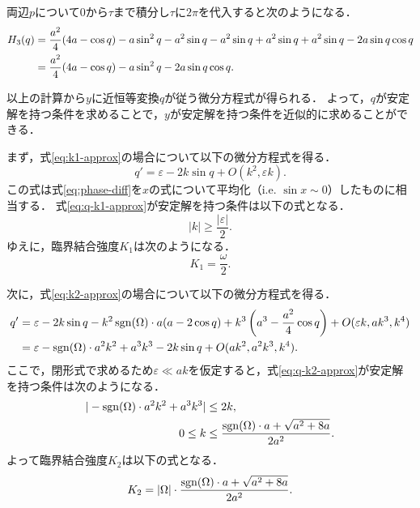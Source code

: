 \documentclass[../main]{subfiles}
\begin{document}
    両辺$p$について$0$から$\tau$まで積分し$\tau$に$2\pi$を代入すると次のようになる．
    \begin{align}
        H_3(q)&=\frac{a^2}{4}(4a-\cos q)-a\sin^2 q-a^2\sin q-a^2\sin q+a^2\sin q+a^2\sin q-2a\sin q\cos q\notag\\
        &=\frac{a^2}{4}(4a-\cos q)-a\sin^2 q-2a\sin q\cos q.
        \label{eq:H3-approx}
    \end{align}

    以上の計算から$y$に近恒等変換$q$が従う微分方程式が得られる．
    よって，$q$が安定解を持つ条件を求めることで，$y$が安定解を持つ条件を近似的に求めることができる．
    
    まず，式\eqref{eq:k1-approx}の場合について以下の微分方程式を得る．
    \begin{equation}
        q'=\varepsilon-2k\sin q+O(k^2,\varepsilon k).
        \label{eq:q-k1-approx}
    \end{equation}
    この式は式\eqref{eq:phase-diff}を$x$の式について平均化（i.e. $\sin x\sim 0$）したものに相当する．
    式\eqref{eq:q-k1-approx}が安定解を持つ条件は以下の式となる．
    \begin{equation}
        |k|\geq\frac{|\varepsilon|}{2}.
    \end{equation}
    ゆえに，臨界結合強度$K_1$は次のようになる．
    \begin{equation}
        \label{eq:K1-approx}
        K_1=\frac{\omega}{2}.
    \end{equation}

    次に，式\eqref{eq:k2-approx}の場合について以下の微分方程式を得る．
    \begin{align}
        \label{eq:q-k2-approx}
        \begin{split}
            q'&=\varepsilon-2k\sin q-k^2\operatorname{sgn}(\Omega)\cdot a(a-2\cos  q)+k^3\left(a^3-\frac{a^2}{4}\cos q\right)+O(\varepsilon k,ak^3,k^4)\\
            &=\varepsilon-\operatorname{sgn}(\Omega)\cdot a^2k^2+a^3k^3-2k\sin q+O(ak^2,a^2k^3,k^4).
        \end{split}
    \end{align}
    ここで，閉形式で求めるため$\varepsilon\ll ak$を仮定すると，式\eqref{eq:q-k2-approx}が安定解を持つ条件は次のようになる．
    \begin{align}
        |-\operatorname{sgn}(\Omega)\cdot a^2k^2+a^3k^3|&\leq 2k,\notag\\
        0\leq k&\leq \frac{\operatorname{sgn}(\Omega) \cdot a+\sqrt{a^2+8a}}{2a^2}.
    \end{align}
    よって臨界結合強度$K_2$は以下の式となる．
    \begin{equation}
        \label{eq:K2-approx}
        K_2=|\Omega|\cdot\frac{\operatorname{sgn}(\Omega) \cdot a+\sqrt{a^2+8a}}{2a^2}.
    \end{equation}
\end{document}

